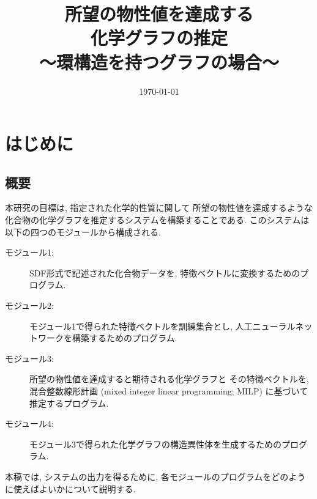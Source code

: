 \documentclass[11pt,titlepage,dvipdfmx,twoside]{jsbook}
\title{{\huge 所望の物性値を達成する\\ 化学グラフの推定}\\ {\large 〜環構造を持つグラフの場合〜}}
\author{\project}
\begin{document}


\date{\today}

\maketitle


\hfill

\chapter*{はじめに}

\section*{概要}
本研究の目標は,
指定された化学的性質に関して
所望の物性値を達成するような
化合物の化学グラフを推定するシステムを構築することである.
このシステムは以下の四つのモジュールから構成される.

\begin{description}
\item[モジュール1:]
  SDF形式で記述された化合物データを, 特徴ベクトルに変換するためのプログラム.
  
\item[モジュール2:] モジュール1で得られた特徴ベクトルを訓練集合とし,
  人工ニューラルネットワークを構築するためのプログラム. 

\item[モジュール3:] 所望の物性値を達成すると期待される化学グラフと
  その特徴ベクトルを, 混合整数線形計画 (mixed integer linear programming; MILP)
  に基づいて推定するプログラム. 

\item[モジュール4:]
  モジュール3で得られた化学グラフの構造異性体を生成するためのプログラム.  
\end{description}

本稿では, システムの出力を得るために, 
各モジュールのプログラムをどのように使えばよいかについて説明する. 
\end{document}
